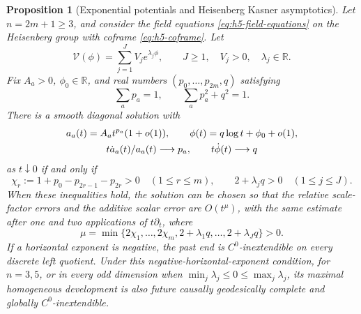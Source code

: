 \documentclass[10pt,a4paper]{article}
\numberwithin{equation}{section}
\newtheorem{proposition}[theorem]{Proposition}
\theoremstyle{definition}
\theoremstyle{remark}
\begin{document}
\begin{proposition}[Exponential potentials and Heisenberg Kasner asymptotics]
\label{prop:heisenberg-exponential-admissibility}
Let $n=2m+1\ge3$, and consider the field equations
\eqref{eq:h5-field-equations} on the Heisenberg group with coframe
\eqref{eq:h5-coframe}.  Let
\[
 \mathcal V(\phi)=\sum_{j=1}^{J}V_j e^{\lambda_j\phi},
 \qquad J\ge1,\quad V_j>0,\quad \lambda_j\in\mathbb R.
\]
Fix $A_a>0$, $\phi_0\in\mathbb R$, and real numbers
$(p_0,\ldots,p_{2m},q)$ satisfying
\[
 \sum_a p_a=1,\qquad \sum_a p_a^2+q^2=1.
\]
There is a smooth diagonal solution with
\begin{gather}
 a_a(t)=A_at^{p_a}(1+o(1)),\qquad
 \phi(t)=q\log t+\phi_0+o(1),\notag\\
 t\dot a_a(t)/a_a(t)\longrightarrow p_a,\qquad
 t\dot\phi(t)\longrightarrow q
 \label{eq:heisenberg-exponential-kasner-limits}
\end{gather}
as $t\downarrow0$ if and only if
\begin{equation}
 \chi_r:=1+p_0-p_{2r-1}-p_{2r}>0\quad(1\le r\le m),
 \qquad 2+\lambda_jq>0\quad(1\le j\le J).
 \label{eq:heisenberg-exponential-admissibility}
\end{equation}
When these inequalities hold, the solution can be chosen so that the
relative scale-factor errors and the additive scalar error are
$O(t^\mu)$, with the same estimate after one and two applications of
$t\partial_t$, where
\[
 \mu=\min\{2\chi_1,\ldots,2\chi_m,
                    2+\lambda_1q,\ldots,2+\lambda_Jq\}>0.
\]
If a horizontal exponent is negative, the past end is
$C^0$-inextendible on every discrete left quotient.  Under this
negative-horizontal-exponent condition, for $n=3,5$, or in every odd dimension when
$\min_j\lambda_j\le0\le\max_j\lambda_j$, its maximal homogeneous
development is also future causally geodesically complete and globally
$C^0$-inextendible.
\end{proposition}
\end{document}
